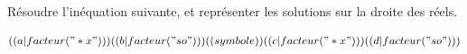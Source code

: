 \exercice

Résoudre l'inéquation suivante, et représenter les solutions sur la droite des réels.

\[
  ((a|facteur("*x")))((b|facteur("so")))((symbole))((c|facteur("*x")))((d|facteur("so")))
\]
